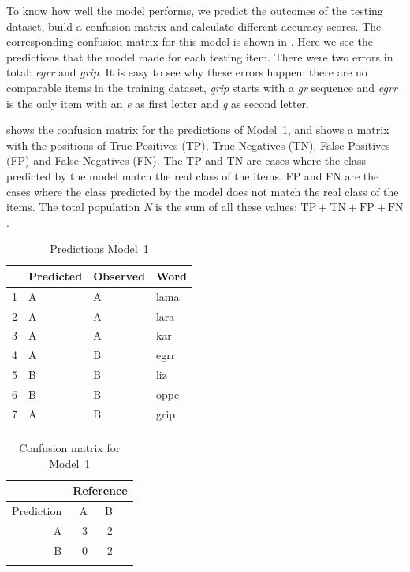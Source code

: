 To know how well the model performs, we predict the outcomes of the testing dataset, build a confusion matrix and calculate different accuracy scores. The corresponding confusion matrix for this model is shown in . Here we see the predictions that the model made for each testing item. There were two errors in total: \textit{egrr} and \textit{grip}. It is easy to see why these errors happen: there are no comparable items in the training dataset, \textit{grip} starts with a \textit{gr} sequence and \textit{egrr} is the only item with an \textit{e} as first letter and \textit{g} as second letter.

 shows the confusion matrix for the predictions of Model~1, and  shows a matrix with the positions of True Positives (TP), True Negatives (TN), False Positives (FP) and False Negatives (FN). The TP and TN are cases where the class predicted by the model match the real class of the items. FP and FN are the cases where the class predicted by the model does not match the real class of the items. The total population \textit{N} is the sum of all these values: $\textrm{TP}+\textrm{TN}+\textrm{FP}+\textrm{FN}$.

\begin{table}%
  \centering
  \begin{tabular}{llll}
    \lsptoprule
    & Predicted & Observed & Word \\
    \midrule
    1 & A & A & lama \\
    2 & A & A & lara \\
    3 & A & A & kar \\
    4 & A & B & egrr \\
    5 & B & B & liz \\
    6 & B & B & oppe \\
    7 & A & B & grip \\
    \lspbottomrule
  \end{tabular}
  \caption{Predictions Model~1}\label{tab:preds-model1}
\end{table}

\begin{table}%
  \centering
  \begin{tabular}{rrrr}
    \lsptoprule
               & \multicolumn{3}{c}{Reference} \\
    \midrule
    Prediction & A  & B                        \\
    A          & 3  & 2                        \\
    B          & 0  & 2                        \\
    \lspbottomrule
  \end{tabular}
    \caption{Confusion matrix for Model~1}\label{tab:model1-conf}
\end{table}


